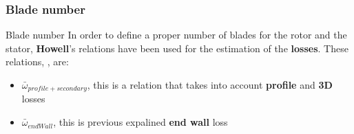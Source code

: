 \subsubsection{Blade number}
	\begin{frame}{Blade number}
		In order to define a proper number of blades for the rotor and the stator, \textbf{Howell}'s relations have been used for the estimation of the \textbf{losses}. These relations, \cite[Ch. 6]{axial2004}, are:
		\begin{itemize}
			\item $\bar{\omega}_{profile + secondary}$, this is a relation that takes into account \textbf{profile} and \textbf{3D} losses
			\item $\bar{\omega}_{endWall}$, this is previous expalined \textbf{end wall} loss
		\end{itemize}
	\end{frame}
